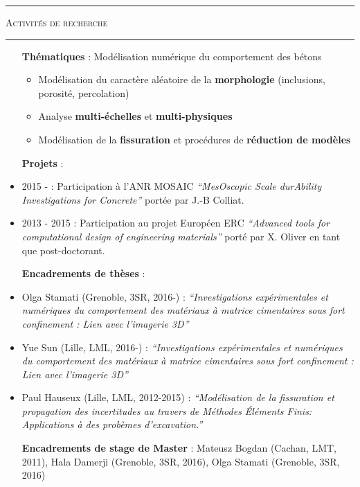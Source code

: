 \documentclass[a4paper,11pt]{article}
\newcommand{\titre}[1]{
  \begin{center}
    \rule{0.4\textwidth}{0.5pt}
    \par\vspace{0.1cm}
    \textsc{\large #1}
    \par\vspace{-0.2cm}
    \par\noindent\rule{0.4\textwidth}{0.5pt}
  \end{center}
}
\begin{document}
\newpage
\titre{Activités de recherche}
\begin{itemize}
  \item[\textbf{Thématiques}] : Modélisation numérique du comportement des bétons
    \begin{itemize}
    \item Modélisation du caractère aléatoire de la \textbf{morphologie} (inclusions, porosité, percolation)
    \item Analyse \textbf{multi-échelles} et \textbf{multi-physiques}
    \item Modélisation de la \textbf{fissuration} et procédures de \textbf{réduction de modèles}
    \end{itemize}
  \item[\textbf{Projets}] :
  \item 2015 - : Participation à l'ANR MOSAIC \textit{``MesOscopic Scale durAbility Investigations for Concrete''} portée par J.-B Colliat.
  \item 2013 - 2015 : Participation au projet Européen ERC \textit{``Advanced tools for computational design of engineering materials''} porté par X. Oliver en tant que post-doctorant.
  \item[\textbf{Encadrements de thèses}] :
  \item Olga Stamati (Grenoble, 3SR, 2016-) : \textit{``Investigations expérimentales et numériques du comportement des matériaux à matrice cimentaires sous fort confinement : Lien avec l'imagerie 3D''}
  \item Yue Sun (Lille, LML, 2016-) : \textit{``Investigations expérimentales et numériques du comportement des matériaux à matrice cimentaires sous fort confinement : Lien avec l'imagerie 3D''}
  \item Paul Hauseux (Lille, LML, 2012-2015) : \textit{``Modélisation de la fissuration et propagation des incertitudes au travers de Méthodes Éléments Finis: Applications à des probèmes d'excavation.''}
  \item[\textbf{Encadrements de stage de Master}] : Mateusz Bogdan (Cachan, LMT, 2011), Hala Damerji (Grenoble, 3SR, 2016), Olga Stamati (Grenoble, 3SR, 2016)

\end{itemize}
\end{document}
